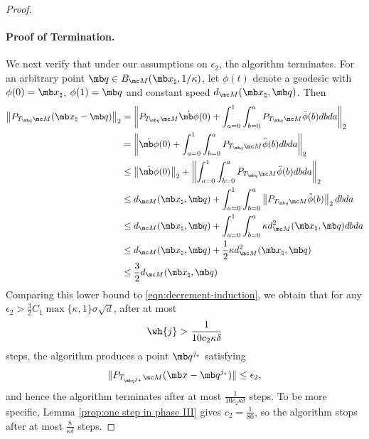 \begin{proof}
\paragraph{Proof of Termination.} We next verify that under our assumptions on $\epsilon_2$, the algorithm terminates. For an arbitrary point $\mb q \in B_{\mc M}( \mb x_\natural, 1/\kappa)$, let $\phi(t)$ denote a geodesic with $\phi(0) = \mb x_\natural$, $\phi(1) =\mb q$ and constant speed $d_{\mc M}(\mb x_\natural, \mb q)$. Then 
\begin{equation}\label{eqn:tangent-upper} 
    \begin{aligned}
        \left\| P_{T_{\mb q} \mc M}(\mb x_\natural - \mb q) \right\|_2
        &= \left\| P_{T_{\mb q}\mc M} \Dot{\mb \phi}(0) + \int_{a=0}^1 \int_{b=0}^a P_{T_{\mb q }\mc M} \Ddot{\phi}(b) db da\right\|_2\\
        &= \left\| \Dot{\mb \phi}(0) + \int_{a=0}^1 \int_{b=0}^a P_{T_{\mb q}\mc M} \Ddot{\phi}(b) db da\right\|_2\\
        &\le \left\| \Dot{\mb \phi}(0) \right\|_2 + \left\| \int_{a=0}^1 \int_{b=0}^a P_{T_{\mb q}\mc M} \Ddot{\phi}(b) db da \right\|_2\\
        &\le d_{\mc M}(\mb x_\natural, \mb q ) +  \int_{a=0}^1 \int_{b=0}^a \left\|P_{T_{\mb q}\mc M} \Ddot{\phi}(b)\right\|_2 db da\\
        &\le d_{\mc M}(\mb x_\natural, \mb q) + \int_{a=0}^1 \int_{b=0}^a \kappa d_{\mc M}^2(\mb x_\natural, \mb q ) db da\\
        &\le d_{\mc M}(\mb x_\natural, \mb q ) + \frac{1}{2} \kappa d_{\mc M}^2(\mb x_\natural, \mb q )\\
        &\le \frac{3}{2} d_{\mc M}(\mb x_\natural, \mb q )
    \end{aligned}
\end{equation}
Comparing this lower bound to \eqref{eqn:decrement-induction}, we obtain that for any $\epsilon_2 > \tfrac{3}{2} C_1 \max\{ \kappa, 1 \} \sigma \sqrt{d}$, after at most 
\begin{equation}
\wh{j} > \frac{1}{10 c_2 \kappa \delta} 
\end{equation}
steps, the algorithm produces a point $\mb q^{j_\star}$ satisfying 
\begin{equation}
    \| P_{T_{\mb q^{j_\star}} \mc M} (\mb x - \mb q^{j_\star} ) \| \le \epsilon_2,
\end{equation}
and hence the algorithm terminates after at most $\frac{1}{10c_2\kappa \delta}$ steps. To be more specific, 
Lemma \ref{prop:one step in phase III} gives $c_2 = \frac{1}{80}$, so the algorithm stops after at most  $\frac{8}{\kappa \delta}$ steps.

\end{proof}
